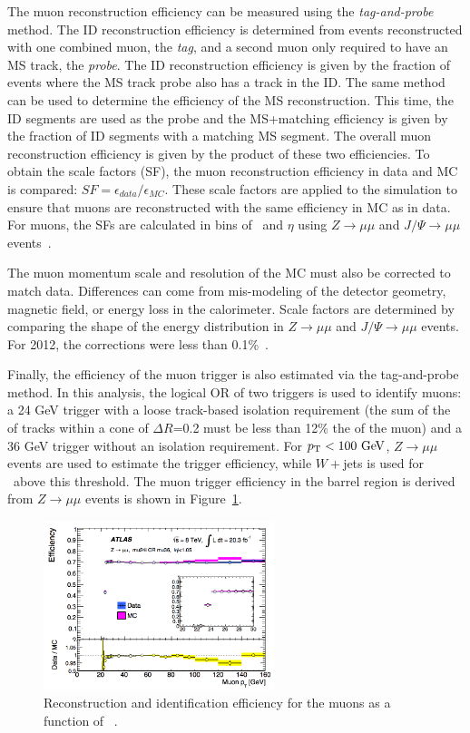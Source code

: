 The muon reconstruction efficiency can be measured using the \emph{tag-and-probe} method. The ID reconstruction efficiency is determined from events reconstructed with one combined muon, the \emph{tag}, and a second muon only required to have an MS track, the \emph{probe}. The ID reconstruction efficiency is given by the fraction of events where the MS track probe also has a track in the ID. The same method can be used to determine the efficiency of the MS reconstruction. This time, the ID segments are used as the probe and the MS+matching efficiency is given by the fraction of ID segments with a matching MS segment. The overall muon reconstruction efficiency is given by the product of these two efficiencies. To obtain the scale factors (SF), the muon reconstruction efficiency in data and MC is compared: $SF = \epsilon_{data}/\epsilon_{MC}$. These scale factors are applied to the simulation to ensure that muons are reconstructed with the same efficiency in MC as in data. For muons, the SFs are calculated in bins of \pt\ and $\eta$ using $Z\rightarrow \mu\mu$ and $J/\Psi\rightarrow \mu\mu$ events~\cite{muonpaper}. 

The muon momentum scale and resolution of the MC must also be corrected to match data. Differences can come from mis-modeling of the detector geometry, magnetic field, or energy loss in the calorimeter. Scale factors are determined by comparing the shape of the energy distribution in $Z\rightarrow \mu\mu$ and $J/\Psi\rightarrow \mu\mu$ events. For 2012, the corrections were less than 0.1\%~\cite{muonpaper}.

Finally, the efficiency of the muon trigger is also estimated via the tag-and-probe method. In this analysis, the logical OR of two triggers is used to identify muons: a 24 GeV trigger with a loose track-based isolation requirement (the sum of the \pt of tracks within a cone of $\Delta R$=0.2 must be less than 12\% the \pt of the muon) and a 36 GeV trigger without an isolation requirement. For $\pt<100 \gev$, $Z\rightarrow\mu\mu$ events are used to estimate the trigger efficiency, while $W+$jets is used for \pt\ above this threshold. The muon trigger efficiency in the barrel region is derived from $Z\rightarrow\mu\mu$ events is shown in Figure~\ref{fig:muontrigger}.

\begin{figure}[hp]
\centering
\includegraphics[width=0.6\textwidth]{fig/obj/muontrigger.png}
\caption{Reconstruction and identification efficiency for the muons as a function of \pt~\cite{Aad:2014fxa}.}
\label{fig:muontrigger}
\end{figure}

